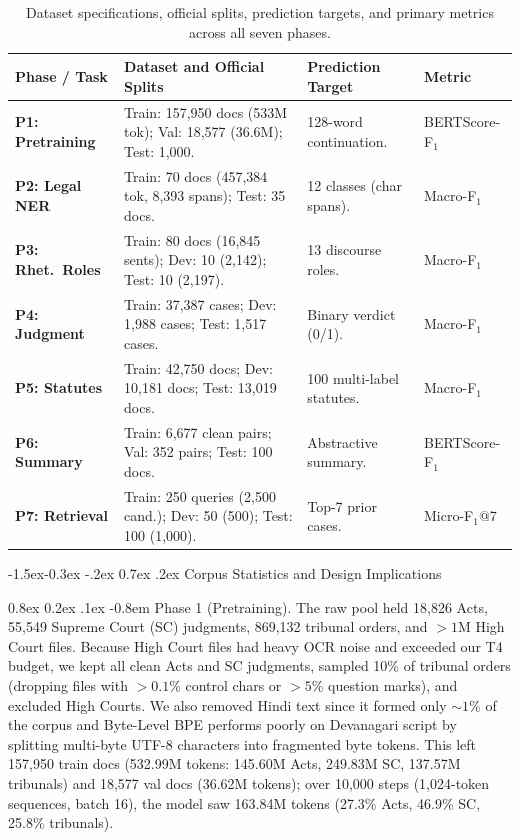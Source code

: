 \documentclass[11pt, oneside]{article}
\makeatletter
\renewcommand\subsection{\@startsection{subsection}{2}{\z@}%
  {-1.5ex\@plus -0.3ex \@minus -.2ex}%
  {0.7ex \@plus .2ex}%
  {\normalfont\large\bfseries}}
\renewcommand\paragraph{\@startsection{paragraph}{4}{\z@}%
  {0.8ex \@plus0.2ex \@minus.1ex}%
  {-0.8em}%
  {\normalfont\normalsize\bfseries}}
\makeatother
\begin{document}
\begin{table}[t]
\centering
\scriptsize
\setlength{\tabcolsep}{2.5pt}
\renewcommand{\arraystretch}{0.84}
\caption{Dataset specifications, official splits, prediction targets, and primary metrics across all seven phases.}
\label{tab:splits_master}
\begin{tabularx}{\textwidth}{@{}p{2.15cm}Xp{2.95cm}p{1.45cm}@{}}
\toprule
\textbf{Phase / Task} & \textbf{Dataset and Official Splits} & \textbf{Prediction Target} & \textbf{Metric} \\
\midrule
\textbf{P1: Pretraining} & Train: 157,950 docs (533M tok); Val: 18,577 (36.6M); Test: 1,000. & 128-word continuation. & BERTScore-F$_1$ \\
\textbf{P2: Legal NER} & Train: 70 docs (457,384 tok, 8,393 spans); Test: 35 docs. & 12 classes (char spans). & Macro-F$_1$ \\
\textbf{P3: Rhet.\ Roles} & Train: 80 docs (16,845 sents); Dev: 10 (2,142); Test: 10 (2,197). & 13 discourse roles. & Macro-F$_1$ \\
\textbf{P4: Judgment} & Train: 37,387 cases; Dev: 1,988 cases; Test: 1,517 cases. & Binary verdict (0/1). & Macro-F$_1$ \\
\textbf{P5: Statutes} & Train: 42,750 docs; Dev: 10,181 docs; Test: 13,019 docs. & 100 multi-label statutes. & Macro-F$_1$ \\
\textbf{P6: Summary} & Train: 6,677 clean pairs; Val: 352 pairs; Test: 100 docs. & Abstractive summary. & BERTScore-F$_1$ \\
\textbf{P7: Retrieval} & Train: 250 queries (2,500 cand.); Dev: 50 (500); Test: 100 (1,000). & Top-7 prior cases. & Micro-F$_1$@7 \\
\bottomrule
\end{tabularx}
\end{table}

\subsection{Corpus Statistics and Design Implications}

\paragraph{Phase 1 (Pretraining).}
The raw pool held 18,826 Acts, 55,549 Supreme Court (SC) judgments, 869,132 tribunal orders, and $>1\text{M}$ High Court files. Because High Court files had heavy OCR noise and exceeded our T4 budget, we kept all clean Acts and SC judgments, sampled 10\% of tribunal orders (dropping files with $>0.1\%$ control chars or $>5\%$ question marks), and excluded High Courts. We also removed Hindi text since it formed only $\sim 1\%$ of the corpus and Byte-Level BPE performs poorly on Devanagari script by splitting multi-byte UTF-8 characters into fragmented byte tokens. This left 157,950 train docs (532.99M tokens: 145.60M Acts, 249.83M SC, 137.57M tribunals) and 18,577 val docs (36.62M tokens); over 10,000 steps (1,024-token sequences, batch 16), the model saw 163.84M tokens (27.3\% Acts, 46.9\% SC, 25.8\% tribunals).
\end{document}
